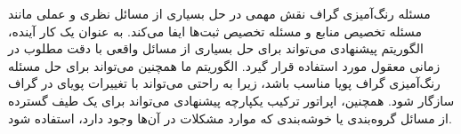 \documentclass[a4paper,10pt]{article}
\begin{document}
        مسئله رنگ‌آمیزی گراف نقش مهمی در حل بسیاری از مسائل نظری و عملی مانند مسئله تخصیص منابع و مسئله تخصیص ثبت‌ها ایفا می‌کند. به عنوان یک کار آینده، الگوریتم پیشنهادی می‌تواند برای حل بسیاری از مسائل واقعی با دقت مطلوب در زمانی معقول مورد استفاده قرار گیرد. الگوریتم ما همچنین می‌تواند برای حل مسئله رنگ‌آمیزی گراف پویا مناسب باشد، زیرا به راحتی می‌تواند با تغییرات پویای در گراف سازگار شود. همچنین، اپراتور ترکیب یکپارچه پیشنهادی می‌تواند برای یک طیف گسترده از مسائل گروه‌بندی یا خوشه‌بندی که موارد مشکلات در آن‌ها وجود دارد، استفاده شود.

        
\end{document}
